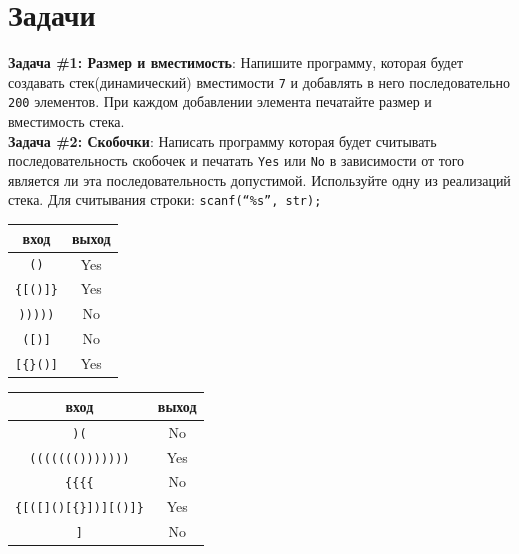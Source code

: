 \documentclass{article}
\begin{document}
\section*{Задачи}
\textbf{Задача \#1: Размер и вместимость}:
Напишите программу, которая будет создавать стек(динамический) вместимости \texttt{7} и добавлять в него последовательно \texttt{200} элементов. При каждом добавлении элемента печатайте размер и вместимость стека.\\
\textbf{Задача \#2: Скобочки}: Написать программу которая будет считывать последовательность скобочек и
печатать \texttt{Yes} или \texttt{No} в зависимости от того является ли эта последовательность допустимой.  Используйте одну из реализаций стека. Для считывания строки: \texttt{scanf(``\%s'', str);}
\begin{multicols}{2}
\begin{center}
\begin{tabular}{ c | c }
 вход & выход \\ \hline
 \texttt{()} & Yes \\
 \texttt{\{[()]\}} & Yes  \\ 
 \texttt{)))))}  &  No \\ 
 \texttt{([)]}  &  No \\ 
 \texttt{[\{\}()]}  &  Yes \\ 
\end{tabular}
\end{center}

\begin{center}
\begin{tabular}{ c | c }
 вход & выход \\ \hline
 \texttt{)(}  &  No \\
 \texttt{((((((()))))))} & Yes \\
 \texttt{\{\{\{\{} & No  \\ 
 \texttt{\{[([]()[\{\}])][()]\}}  &  Yes \\ 
 \texttt{]}  &  No \\ 
\end{tabular}
\end{center}
\end{multicols}

\newpage
\end{document}
